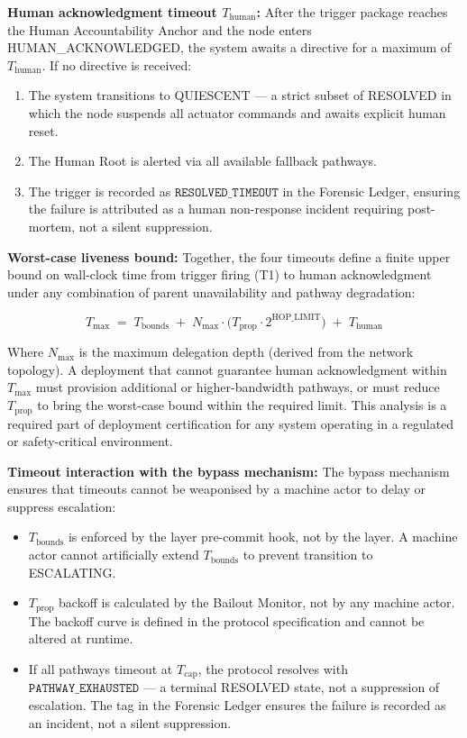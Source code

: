 \bigskip
\noindent\textbf{Human acknowledgment timeout $T_{\text{human}}$:} After
the trigger package reaches the Human Accountability Anchor and the node
enters HUMAN\_ACKNOWLEDGED, the system awaits a directive for a maximum
of $T_{\text{human}}$. If no directive is received:

\begin{enumerate}
\item The system transitions to QUIESCENT — a strict subset of RESOLVED
  in which the node suspends all actuator commands and awaits explicit
  human reset.
\item The Human Root is alerted via all available fallback pathways.
\item The trigger is recorded as $\texttt{RESOLVED\_TIMEOUT}$ in the
  Forensic Ledger, ensuring the failure is attributed as a human
  non-response incident requiring post-mortem, not a silent suppression.
\end{enumerate}

\bigskip
\noindent\textbf{Worst-case liveness bound:} Together, the four timeouts
define a finite upper bound on wall-clock time from trigger firing (T1) to
human acknowledgment under any combination of parent unavailability and
pathway degradation:

\begin{equation}
T_{\max} \;=\; T_{\text{bounds}} \;+\;
N_{\max} \cdot \bigl( T_{\text{prop}} \cdot 2^{\text{HOP\_LIMIT}} \bigr)
\;+\; T_{\text{human}} \tag{eq:tmax}
\end{equation}

Where $N_{\max}$ is the maximum delegation depth (derived from the network
topology). A deployment that cannot guarantee human acknowledgment within
$T_{\max}$ must provision additional or higher-bandwidth pathways, or must
reduce $T_{\text{prop}}$ to bring the worst-case bound within the required
limit. This analysis is a required part of deployment certification for any
\bxthree{} system operating in a regulated or safety-critical environment.

\bigskip
\noindent\textbf{Timeout interaction with the bypass mechanism:} The bypass
mechanism ensures that timeouts cannot be weaponised by a machine actor to
delay or suppress escalation:

\begin{itemize}\itemsep=0pt
\item $T_{\text{bounds}}$ is enforced by the \fact{} layer pre-commit hook,
  not by the \bounds{} layer. A machine actor cannot artificially extend
  $T_{\text{bounds}}$ to prevent transition to ESCALATING.
\item $T_{\text{prop}}$ backoff is calculated by the Bailout Monitor, not
  by any machine actor. The backoff curve is defined in the protocol
  specification and cannot be altered at runtime.
\item If all pathways timeout at $T_{\text{cap}}$, the protocol resolves
  with $\texttt{PATHWAY\_EXHAUSTED}$ — a terminal RESOLVED state, not a
  suppression of escalation. The tag in the Forensic Ledger ensures the
  failure is recorded as an incident, not a silent suppression.
\end{itemize}

